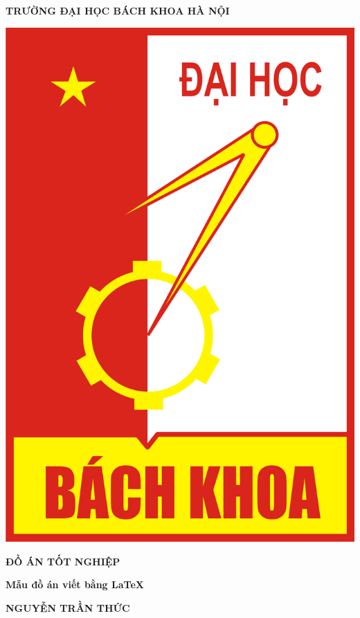 \begin{titlepage}
\begin{center}

\textbf{{\large TRƯỜNG ĐẠI HỌC BÁCH KHOA HÀ NỘI}}

\vspace{1cm}
\includegraphics[scale=0.2]{figures/logoBK}
\vspace{1.5cm}

\textbf{{\Huge ĐỒ ÁN TỐT NGHIỆP}}
\vspace{0.8cm}

\textbf{{\LARGE Mẫu đồ án viết bằng \LaTeX}}



\vspace{0.7cm}

\textbf{{\large NGUYỄN TRẦN THỨC}}


\end{center}
\end{titlepage}
